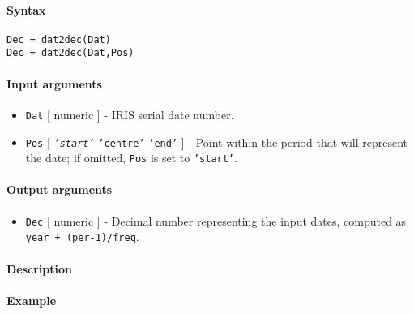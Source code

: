 


	\paragraph{Syntax}

\begin{verbatim}
Dec = dat2dec(Dat)
Dec = dat2dec(Dat,Pos)
\end{verbatim}

\paragraph{Input arguments}

\begin{itemize}
\item
  \texttt{Dat} {[} numeric {]} - IRIS serial date number.
\item
  \texttt{Pos} {[} \emph{\texttt{'start'}} \textbar{} \texttt{'centre'}
  \textbar{} \texttt{'end'} {]} - Point within the period that will
  represent the date; if omitted, \texttt{Pos} is set to
  \texttt{'start'}.
\end{itemize}

\paragraph{Output arguments}

\begin{itemize}
\itemsep1pt\parskip0pt
\item
  \texttt{Dec} {[} numeric {]} - Decimal number representing the input
  dates, computed as \texttt{year + (per-1)/freq}.
\end{itemize}

\paragraph{Description}

\paragraph{Example}


